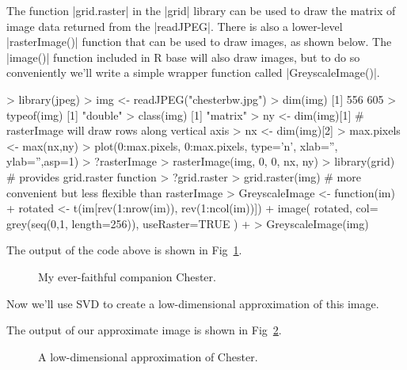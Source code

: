 The function |grid.raster| in the |grid| library can be used to draw the matrix of image data returned from the |readJPEG|.  There is also a lower-level |rasterImage()| function that can be used to draw images, as shown below. The |image()| function included in R base will also draw images, but to do so conveniently we'll write a simple wrapper function called |GreyscaleImage()|.

%
\begin{R}
> library(jpeg)
> img <- readJPEG("chesterbw.jpg")
> dim(img)
[1] 556 605
> typeof(img)
[1] "double"
> class(img)
[1] "matrix"
> ny <- dim(img)[1]  # rasterImage will draw rows along vertical axis
> nx <- dim(img)[2]
> max.pixels <- max(nx,ny)
> plot(0:max.pixels, 0:max.pixels, type='n', xlab='', ylab='',asp=1)
> ?rasterImage
> rasterImage(img, 0, 0, nx, ny)
> library(grid) # provides grid.raster function
> ?grid.raster
> grid.raster(img)  # more convenient but less flexible than rasterImage
> GreyscaleImage <- function(im){
+    rotated <- t(im[rev(1:nrow(im)), rev(1:ncol(im))])
+    image( rotated, col= grey(seq(0,1, length=256)), useRaster=TRUE )
+ }
> GreyscaleImage(img)
\end{R}
The output of the code above is shown in Fig~\ref{fig:chester}.
\begin{figure}[ht!]
  \caption{My ever-faithful companion Chester.\label{fig:chester}}
\end{figure}


Now we'll use SVD to create a low-dimensional approximation of this image.
%
%
The output of our approximate image is shown in Fig~\ref{fig:chester15}.
\begin{figure}[ht!]
  \caption{A low-dimensional approximation of Chester.\label{fig:chester15}}
\end{figure}


